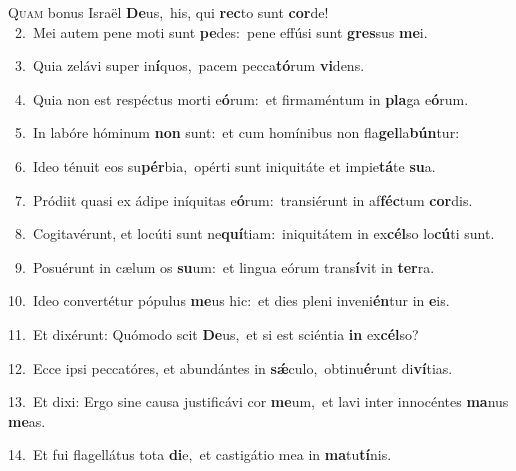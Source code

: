\lettrine{\initial\textcolor{\initialcolor}{Q}}{uam} bonus Israël \textbf{De}\-us,~\star his, qui \textbf{rec}\-to sunt \textbf{cor}\-de!\\
{\numbfont\textcolor{\numbcolor}{~2.}}~Mei autem pene moti sunt \textbf{pe}\-des:~\star pene effúsi sunt \textbf{gres}\-sus \textbf{me}\-i.\par
{\numbfont\textcolor{\numbcolor}{~3.}}~Quia zelávi super in\-\textbf{í}\-quos,~\star pacem pecca\-\textbf{tó}\-rum \textbf{vi}\-dens.\par
{\numbfont\textcolor{\numbcolor}{~4.}}~Quia non est respéctus morti e\-\textbf{ó}\-rum:~\star et firmaméntum in \textbf{pla}\-ga e\-\textbf{ó}\-rum.\par
{\numbfont\textcolor{\numbcolor}{~5.}}~In labóre hóminum \textbf{non} sunt:~\star et cum homínibus non fla\-\textbf{gel}\-la\-\textbf{bún}\-tur:\par
{\numbfont\textcolor{\numbcolor}{~6.}}~Ideo ténuit eos su\-\textbf{pér}\-bia,~\star opérti sunt iniquitáte et impie\-\textbf{tá}\-te \textbf{su}\-a.\par
{\numbfont\textcolor{\numbcolor}{~7.}}~Pródiit quasi ex ádipe iníquitas e\-\textbf{ó}\-rum:~\star transiérunt in af\-\textbf{féc}\-tum \textbf{cor}\-dis.\par
{\numbfont\textcolor{\numbcolor}{~8.}}~Cogitavérunt, et locúti sunt ne\-\textbf{quí}\-tiam:~\star iniquitátem in ex\-\textbf{cél}\-so lo\-\textbf{cú}\-ti sunt.\par
{\numbfont\textcolor{\numbcolor}{~9.}}~Posuérunt in cælum os \textbf{su}\-um:~\star et lingua eórum trans\-\textbf{í}\-vit in \textbf{ter}\-ra.\par
{\numbfont\textcolor{\numbcolor}{10.}}~Ideo convertétur pópulus \textbf{me}\-us hic:~\star et dies pleni inveni\-\textbf{én}\-tur in \textbf{e}\-is.\par
{\numbfont\textcolor{\numbcolor}{11.}}~Et dixérunt: Quómodo scit \textbf{De}\-us,~\star et si est sciéntia \textbf{in} ex\-\textbf{cél}\-so?\par
{\numbfont\textcolor{\numbcolor}{12.}}~Ecce ipsi peccatóres, et abundántes in \textbf{sǽ}\-culo,~\star obtinu\-\textbf{é}\-runt di\-\textbf{ví}\-tias.\par
{\numbfont\textcolor{\numbcolor}{13.}}~Et dixi: Ergo sine causa justificávi cor \textbf{me}\-um,~\star et lavi inter innocéntes \textbf{ma}\-nus \textbf{me}\-as.\par
{\numbfont\textcolor{\numbcolor}{14.}}~Et fui flagellátus tota \textbf{di}\-e,~\star et castigátio mea in \textbf{ma}\-tu\-\textbf{tí}\-nis.\par
